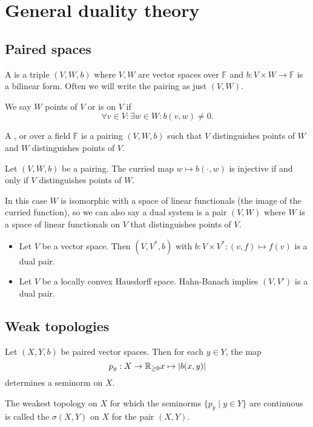 \section{General duality theory}
\subsection{Paired spaces}
\begin{definition}
A  is a triple $(V,W, b)$ where $V,W$ are vector spaces over $\mathbb{F}$ and $b: V\times W\to \mathbb{F}$ is a bilinear form. Often we will write the pairing as just $(V,W)$.

We say $W$  points of $V$ or is  on $V$ if
\[ \forall v\in V: \exists w\in W: b(v,w) \neq 0. \]

A ,  or  over a field $\mathbb{F}$ is a pairing $(V,W,b)$ such that $V$ distinguishes points of $W$ and $W$ distinguishes points of $V$.
\end{definition}

\begin{lemma}
Let $(V,W, b)$ be a pairing. The curried map $w\mapsto b(\cdot, w)$ is injective \textup{if and only if} $V$ distinguishes points of $W$.
\end{lemma}
In this case $W$ is isomorphic with a space of linear functionals (the image of the curried function), so we can also say a dual system is a pair $(V,W)$ where $W$ is a space of linear functionals on $V$ that distinguishes points of $V$.

\begin{example}
\begin{itemize}
\item Let $V$ be a vector space. Then $(V,V^*, b)$ with $b:V\times V^*: (v,f)\mapsto f(v)$ is a dual pair.
\item Let $V$ be a locally convex Hausdorff space. Hahn-Banach implies $(V,V')$ is a dual pair.
\end{itemize}
\end{example}

\subsection{Weak topologies}
\begin{definition}
Let $(X,Y,b)$ be paired vector spaces. Then for each $y\in Y$, the map
\[ p_y: X\to \mathbb{R}_{\geq 0} x\mapsto |b(x,y)| \]
determines a seminorm on $X$.

The weakest topology on $X$ for which the seminorms $\{p_y\;|\;y\in Y\}$ are continuous is called the  $\sigma(X,Y)$ on $X$ for the pair $(X,Y)$.
\end{definition}

